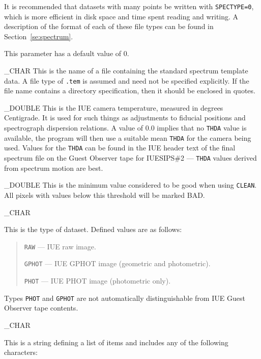 {{   It is recommended that datasets with many points be written with
   \verb+SPECTYPE=0+, which is more efficient in disk space and time spent
   reading and writing.
   A description of the format of each of these file types can be found
   in Section~\ref{se:spectrum}\@.

   This parameter has a default value of 0.
}

{
   \_CHAR
}{
   This is the name of a file containing the standard spectrum template
   data.
   A  file type of \verb+.tem+ is assumed and need not be specified
   explicitly.
   If the file name contains a directory specification, then it should be
   enclosed in quotes.
}

{
   \_DOUBLE
}{
   This is the IUE camera temperature, measured in degrees Centigrade.
   It is used for such things as adjustments to fiducial positions
   and spectrograph dispersion relations.
   A value of 0.0 implies that no \verb+THDA+ value is available, the program
   will then  use a suitable mean \verb+THDA+ for the camera being used.
   Values for the \verb+THDA+ can be found in the IUE header text of the final
   spectrum file on the Guest Observer tape for IUESIPS\#2 ---
   \verb+THDA+ values derived from spectrum motion are best.
}

{
   \_DOUBLE
}{
   This is the  minimum value considered to be good when using \verb+CLEAN+\@.
   All pixels with values below this threshold will be marked BAD.
}

{
   \_CHAR
}{
   This is the type of dataset.
   Defined values are as follows:

   \begin {quote}
   \begin {description}
      \item {\tt RAW} --- IUE raw image.
      \item {\tt GPHOT} --- IUE GPHOT image (geometric and photometric).
      \item {\tt PHOT} --- IUE PHOT image (photometric only).
   \end {description}
   \end {quote}

   Types \verb+PHOT+ and \verb+GPHOT+ are not automatically distinguishable
   from IUE Guest Observer tape contents.
}

{
   \_CHAR
}{
   This is a string defining a list of items and includes
   any of the following characters:

}}

